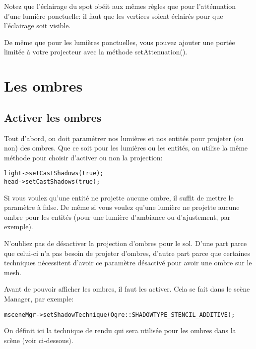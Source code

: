 Notez que l'\'eclairage du spot ob\'eit aux m\^emes r\`egles que pour l'att\'enuation d'une lumi\`ere ponctuelle: il faut que les vertices soient \'eclair\'es pour que l'\'eclairage soit visible.


De m\^eme que pour les lumi\`eres ponctuelles, vous pouvez ajouter une port\'ee limit\'ee \`{a} votre projecteur avec la m\'ethode setAttenuation().






\section{Les ombres}


\subsection{Activer les ombres}

Tout d'abord, on doit param\'etrer nos lumi\`eres et nos entit\'es pour projeter (ou non) des ombres.
Que ce soit pour les lumi\`eres ou les entit\'es, on utilise la m\^eme m\'ethode pour choisir d'activer ou non la projection:

\begin{lstlisting}
light->setCastShadows(true);
head->setCastShadows(true);
\end{lstlisting}


Si vous voulez qu'une entit\'e ne projette aucune ombre, il suffit de mettre le param\`etre \`{a} false. De m\^eme si vous voulez qu'une lumi\`ere ne projette aucune ombre pour les entit\'es (pour une lumi\`ere d'ambiance ou d'ajustement, par exemple).

N'oubliez pas de d\'esactiver la projection d'ombres pour le sol. D'une part parce que celui-ci n'a pas besoin de projeter d'ombres, d'autre part parce que certaines techniques n\'ecessitent d'avoir ce param\`etre d\'esactiv\'e pour avoir une ombre sur le mesh.

Avant de pouvoir afficher les ombres, il faut les activer. Cela se fait dans le sc\`ene Manager, par exemple:

\begin{lstlisting}
msceneMgr->setShadowTechnique(Ogre::SHADOWTYPE_STENCIL_ADDITIVE);
\end{lstlisting}



On d\'efinit ici la technique de rendu qui sera utilis\'ee pour les ombres dans la sc\`ene (voir ci-dessous).




